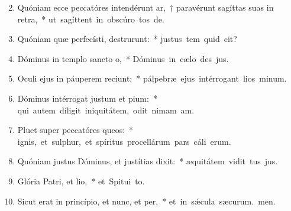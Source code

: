 \begin{flushleft}
\begin{enumerate}[leftmargin=*]
\setcounter{enumi}{1}

\item Quóniam ecce peccatóres intendérunt ar,~† paravérunt sagíttas suas in retra,~* \mbox{ut sagíttent in obscúro tos de.}

\item Quóniam quæ perfecísti, destrurunt:~* \mbox{justus tem quid cit?}

\item Dóminus in templo sancto o,~* \mbox{Dóminus in cælo des jus.}

\item Oculi ejus in páuperem reciunt:~* \mbox{pálpebræ ejus intérrogant lios minum.}

\item Dóminus intérrogat justum et pium:~* \mbox{qui autem díligit iniquitátem, odit nimam am.}

\item Pluet super peccatóres queos:~* \mbox{ignis, et sulphur, et spíritus procellárum pars cáli erum.}

\item Quóniam justus Dóminus, et justítias dixit:~* \mbox{æquitátem vidit tus jus.}

\item Glória Patri, et lio,~* \mbox{et Spitui to.}

\item Sicut erat in princípio, et nunc, et per,~* \mbox{et in s\'{\ae}cula sæcurum. men.}

\end{enumerate}
\end{flushleft}


